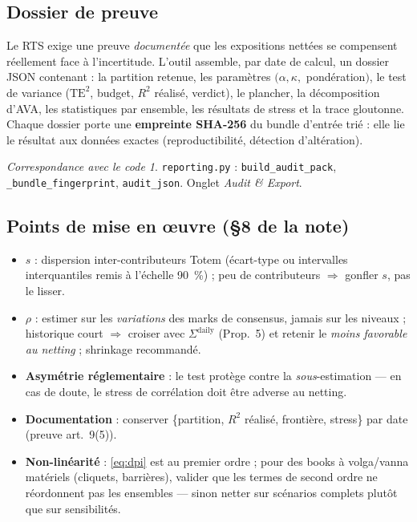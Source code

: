\documentclass[11pt,a4paper]{article}
\newcommand{\code}[1]{\texttt{#1}}
\theoremstyle{plain}
\theoremstyle{definition}
\theoremstyle{remark}
\newtheorem*{impl}{Correspondance avec le code}
\begin{document}
\subsection{Dossier de preuve}
Le RTS exige une preuve \emph{documentée} que les expositions nettées se compensent
réellement face à l'incertitude. L'outil assemble, par date de calcul, un dossier JSON
contenant : la partition retenue, les paramètres $(\alpha,\kappa,$ pondération$)$, le
test de variance ($\mathrm{TE}^2$, budget, $R^2$ réalisé, verdict), le plancher, la
décomposition d'AVA, les statistiques par ensemble, les résultats de stress et la trace
gloutonne. Chaque dossier porte une \textbf{empreinte SHA-256} du bundle d'entrée trié :
elle lie le résultat aux données exactes (reproductibilité, détection d'altération).

\begin{impl}
\code{reporting.py} : \code{build\_audit\_pack}, \code{\_bundle\_fingerprint},
\code{audit\_json}. Onglet \emph{Audit \& Export}.
\end{impl}

\subsection{Points de mise en œuvre (\S8 de la note)}
\begin{itemize}[nosep,leftmargin=1.2em]
\item \textbf{$s$} : dispersion inter-contributeurs Totem (écart-type ou intervalles
  interquantiles remis à l'échelle 90~\%) ; peu de contributeurs $\Rightarrow$ gonfler
  $s$, pas le lisser.
\item \textbf{$\rho$} : estimer sur les \emph{variations} des marks de consensus, jamais
  sur les niveaux ; historique court $\Rightarrow$ croiser avec $\Sigma^{\mathrm{daily}}$
  (Prop.~5) et retenir le \emph{moins favorable au netting} ; shrinkage recommandé.
\item \textbf{Asymétrie réglementaire} : le test protège contre la \emph{sous}-estimation
  --- en cas de doute, le stress de corrélation doit être adverse au netting.
\item \textbf{Documentation} : conserver \{partition, $R^2$ réalisé, frontière, stress\}
  par date (preuve art.~9(5)).
\item \textbf{Non-linéarité} : \eqref{eq:dpi} est au premier ordre ; pour des books à
  volga/vanna matériels (cliquets, barrières), valider que les termes de second ordre ne
  réordonnent pas les ensembles --- sinon netter sur scénarios complets plutôt que sur
  sensibilités.
\end{itemize}
\end{document}
